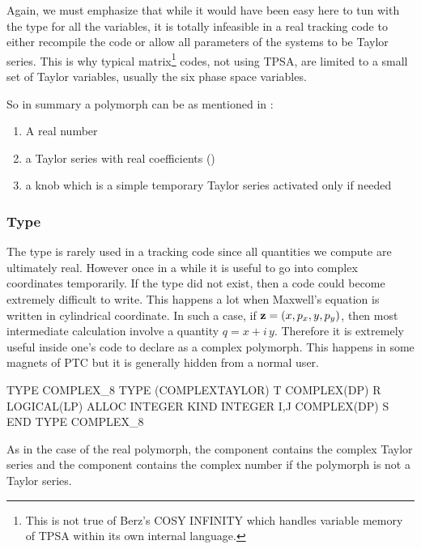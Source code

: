 \documentclass[english,12pt,article]{article} %
\begin{document}
Again, we must emphasize that while it would have been easy here to tun with  the type  for all the variables, it is totally infeasible in a real tracking code to either recompile the code or allow all parameters of the systems to be Taylor series. This is why typical matrix\footnote{This is not true of Berz's COSY INFINITY which handles variable memory of TPSA within its own internal language.} codes, not using TPSA, are limited to a small set of Taylor variables, usually the six phase space variables.

So in summary a polymorph can be as mentioned in :

\begin{enumerate}
 \item A real number
 \item a Taylor series with real coefficients ()
 \item a knob which is a simple temporary Taylor series activated only if needed
\end{enumerate}

 \subsubsection{Type \protect{}}  \label{sec:complex_8}
 
 The type  \protect{} is rarely used in a tracking code since all quantities we compute are ultimately real. However once in a while it is useful to go into complex coordinates temporarily. If the type  did not exist, then a code could become extremely difficult to write. This happens a lot when Maxwell's equation is written in cylindrical coordinate. In such a case, if ${\bf z}=(x,p_x,y,p_y)$, then most intermediate calculation involve a quantity $q=x+i\,y$. Therefore it is extremely useful inside one's code to declare  as a complex polymorph. This happens in some magnets of PTC but it is generally hidden from a normal user. 
 
 \begin{example2}
TYPE COMPLEX_8
 TYPE (COMPLEXTAYLOR) T 
 COMPLEX(DP) R
 LOGICAL(LP) ALLOC
 INTEGER KIND
 INTEGER I,J 
 COMPLEX(DP) S
END TYPE COMPLEX_8
  \end{example2}
  
 As in the case of the real polymorph, the  component contains the complex Taylor series and the  component contains the complex number if the polymorph is not a Taylor series. 
  
\end{document}
